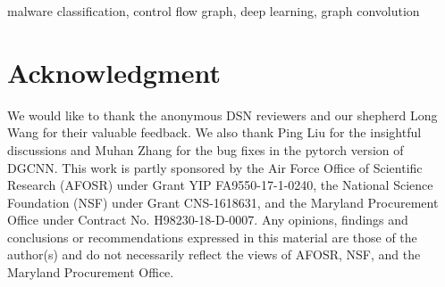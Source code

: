 \documentclass[10pt, conference]{IEEEtran}
\begin{document}
\begin{IEEEkeywords}
malware classification, control flow graph, deep learning, graph convolution
\end{IEEEkeywords}









\section*{Acknowledgment}
We would like to thank the anonymous DSN reviewers and our shepherd Long Wang for their valuable feedback.
We also thank Ping Liu for the insightful discussions and Muhan Zhang for the bug fixes in the pytorch version of DGCNN.
This work is partly sponsored by the Air Force Office of Scientific Research (AFOSR) under Grant YIP FA9550-17-1-0240,
the National Science Foundation (NSF) under Grant CNS-1618631, and the Maryland Procurement Office under Contract No. H98230-18-D-0007.
Any opinions, findings and conclusions or recommendations expressed in this material are those of the author(s)
and do not necessarily reflect the views of AFOSR, NSF, and the Maryland Procurement Office.



\end{document}
